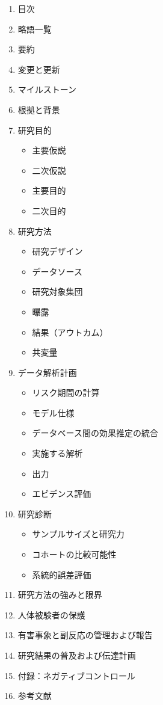 \documentclass[
  11pt]{book}
\providecommand{\tightlist}{%
  \setlength{\itemsep}{0pt}\setlength{\parskip}{0pt}}
\theoremstyle{definition}
\theoremstyle{definition}
\theoremstyle{definition}
\theoremstyle{definition}
\theoremstyle{remark}
\begin{document}
\begin{enumerate}
\def\labelenumi{\arabic{enumi}.}
\tightlist
\item
  目次
\item
  略語一覧
\item
  要約
\item
  変更と更新
\item
  マイルストーン
\item
  根拠と背景
\item
  研究目的

  \begin{itemize}
  \tightlist
  \item
    主要仮説
  \item
    二次仮説
  \item
    主要目的
  \item
    二次目的
  \end{itemize}
\item
  研究方法

  \begin{itemize}
  \tightlist
  \item
    研究デザイン
  \item
    データソース
  \item
    研究対象集団
  \item
    曝露
  \item
    結果（アウトカム）
  \item
    共変量
  \end{itemize}
\item
  データ解析計画

  \begin{itemize}
  \tightlist
  \item
    リスク期間の計算
  \item
    モデル仕様
  \item
    データベース間の効果推定の統合
  \item
    実施する解析
  \item
    出力
  \item
    エビデンス評価
  \end{itemize}
\item
  研究診断

  \begin{itemize}
  \tightlist
  \item
    サンプルサイズと研究力
  \item
    コホートの比較可能性
  \item
    系統的誤差評価
  \end{itemize}
\item
  研究方法の強みと限界
\item
  人体被験者の保護
\item
  有害事象と副反応の管理および報告
\item
  研究結果の普及および伝達計画
\item
  付録：ネガティブコントロール
\item
  参考文献
\end{enumerate}
\end{document}
